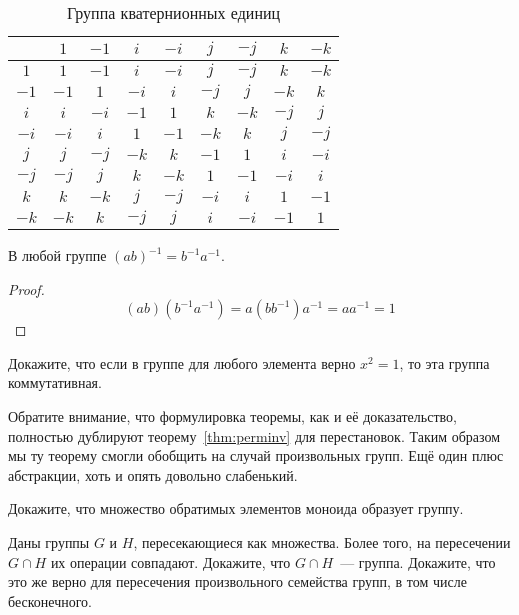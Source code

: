 \begin{table}[h]
	\centering
	\begin{tabular}{c|cccccccc}
		& $1$ & $-1$ & $i$ & $-i$ & $j$ & $-j$ & $k$ & $-k$ \\ 
		\hline $1$ & $1$ & $-1$ & $i$ & $-i$ & $j$ & $-j$ & $k$ & $-k$  \\ 
		$-1$ & $-1$ & $1$&$-i$ &$i$ & $-j$ & $j$ & $-k$ & $k$ \\ 
		$i$ & $i$ & $-i$ & $-1$ & $1$ & $k$& $-k$ & $-j$ & $j$ \\ 
		$-i$ & $-i$ & $i$ & $1$ & $-1$ & $-k$& $k$ & $j$ & $-j$ \\ 
		$j$ & $j$ & $-j$ & $-k$ &$k$ & $-1$& $1$ & $i$ & $-i$ \\ 
		$-j$ & $-j$ & $j$ & $k$ &$-k$ & $1$& $-1$ & $-i$ & $i$ \\ 
		$k$ & $k$ & $-k$ & $j$ & $-j$ &$-i$ & $i$  & $1$ &$-1$  \\ 
		$-k$ & $-k$ & $k$ & $-j$ & $j$ &$i$ & $-i$  & $-1$ &$1$  \\ 
	\end{tabular}
	\caption{Группа кватернионных единиц}\label{tb:qtgrp}
\end{table}

\begin{thm}
	В любой группе $(ab)^{-1}=b^{-1}a^{-1}$.
\end{thm}
\begin{proof}
	\[
	(ab)(b^{-1}a^{-1}) = a(bb^{-1})a^{-1} = aa^{-1} = 1
	\]
\end{proof}

\begin{exercise}
	Докажите, что если в группе для любого элемента верно $x^2 = 1$, то эта группа коммутативная.
\end{exercise}

Обратите внимание, что формулировка теоремы, как и её доказательство, полностью дублируют теорему~\ref{thm:perminv} для перестановок. Таким образом мы ту теорему смогли обобщить на случай произвольных групп. Ещё один плюс абстракции, хоть и опять довольно слабенький.

\begin{exercise}
	Докажите, что множество обратимых элементов моноида образует группу.
\end{exercise}

\begin{exercise}\label{ex:grpint}
	Даны группы $G$ и $H$, пересекающиеся как множества. Более того, на пересечении $G\cap H$ их операции совпадают. Докажите, что $G\cap H$~--- группа. Докажите, что это же верно для пересечения произвольного семейства групп, в том числе бесконечного.
\end{exercise}

